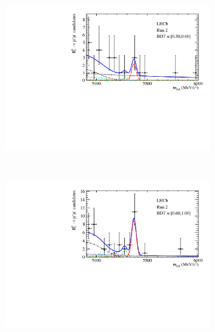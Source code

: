 \begin{figure}[htbp]
\begin{subfigure}[b]{0.48\textwidth}
        \includegraphics[width=\textwidth]{./Figs/BFAnalysis/Bsmumu_Fit_Run2_bin4.pdf}
    \end{subfigure}
    ~ %
    \begin{subfigure}[b]{0.48\textwidth}
       \includegraphics[width=\textwidth]{./Figs/BFAnalysis/Bsmumu_Fit_Run2_bin5.pdf}
    \end{subfigure}


\end{figure}
